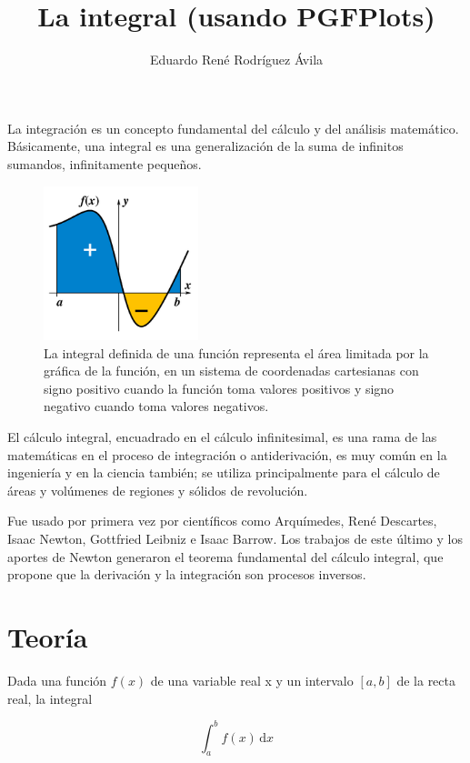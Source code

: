 \documentclass[12pt,letterpaper]{article}
\author{Eduardo René Rodríguez Ávila}
\title{La integral (usando PGFPlots)}
\begin{document}
	
\maketitle

La integración es un concepto fundamental del cálculo y del análisis matemático. Básicamente, una integral es una generalización de la suma de infinitos sumandos, infinitamente pequeños.

\begin{figure}[h] 
	\centering
	\includegraphics[width=0.4\textwidth]{img/integral_example.png}
	\caption{La integral definida de una función representa el área limitada por la gráfica de la función, en un sistema de coordenadas cartesianas con signo positivo cuando la función toma valores positivos y signo negativo cuando toma valores negativos.}
	\label{fig:uno}
\end{figure}

El cálculo integral, encuadrado en el cálculo infinitesimal, es una rama de las matemáticas en el proceso de integración o antiderivación, es muy común en la ingeniería y en la ciencia también; se utiliza principalmente para el cálculo de áreas y volúmenes de regiones y sólidos de revolución.

Fue usado por primera vez por científicos como Arquímedes, René Des\-car\-tes, Isaac Newton, Gottfried Leibniz e Isaac Barrow. Los trabajos de este último y los aportes de Newton generaron el teorema fundamental del cálculo integral, que propone que la derivación y la integración son procesos inversos.

\section{Teoría}

Dada una función $f(x)$ de una variable real x y un intervalo $[a,b]$ de la recta real, la integral

\begin{displaymath}
	\int_{a}^{b} f(x) \,\mathrm{d}x
\end{displaymath}
\end{document}
